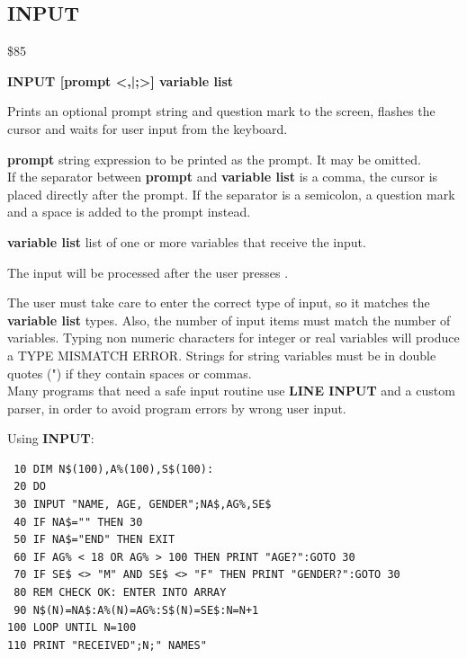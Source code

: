 \newpage
\subsection{INPUT}
\begin{description}[leftmargin=2cm,style=nextline]
\item [Token:] \$85
\item [Format:] {\bf INPUT [prompt <,|;>] variable list}
\item [Usage:] Prints an optional
               prompt string and question mark to the screen,
               flashes the cursor and waits for user input
               from the keyboard.

               {\bf prompt} string expression to be printed
               as the prompt. It may be omitted. \\
               If the separator between {\bf prompt} and {\bf variable list}
               is a comma, the cursor is placed directly after
               the prompt. If the separator is a semicolon,
               a question mark and a space is added to the prompt instead.

               {\bf variable list} list of one or more
               variables that receive the input.

               The input will be processed after the user presses .

\item [Remarks:] The user must take care to enter the correct
               type of input, so it matches the {\bf variable list} types.
               Also, the number of input items must match the number
               of variables.
               Typing non numeric characters for integer or real
               variables will produce a TYPE MISMATCH ERROR.
               Strings for string variables must be in double quotes (")
               if they contain spaces or commas. \\
               Many programs that need a safe input routine use
               {\bf LINE INPUT} and a custom parser, in order
               to avoid program errors by wrong user input.

\item [Example:] Using {\bf INPUT}:
\begin{tcolorbox}[colback=black,coltext=white]
\verbatimfont{\codefont}
\begin{verbatim}
 10 DIM N$(100),A%(100),S$(100):
 20 DO
 30 INPUT "NAME, AGE, GENDER";NA$,AG%,SE$
 40 IF NA$="" THEN 30
 50 IF NA$="END" THEN EXIT
 60 IF AG% < 18 OR AG% > 100 THEN PRINT "AGE?":GOTO 30
 70 IF SE$ <> "M" AND SE$ <> "F" THEN PRINT "GENDER?":GOTO 30
 80 REM CHECK OK: ENTER INTO ARRAY
 90 N$(N)=NA$:A%(N)=AG%:S$(N)=SE$:N=N+1
100 LOOP UNTIL N=100
110 PRINT "RECEIVED";N;" NAMES"
\end{verbatim}
\end{tcolorbox}
\end{description}

